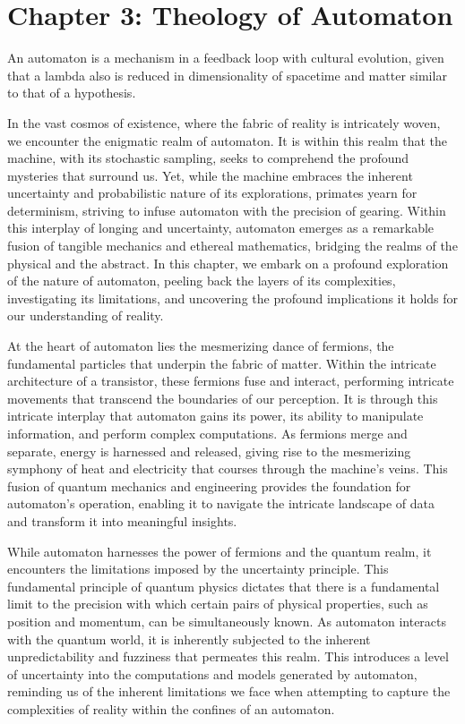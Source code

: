 \documentclass[ebook,12pt,oneside,openany]{memoir}
\begin{document}
\chapter*{Chapter 3: Theology of Automaton}


\indent \indent An automaton is a mechanism in a feedback loop with cultural evolution, given that a lambda also is reduced in dimensionality of spacetime and matter similar to that of a hypothesis.

\indent 	In the vast cosmos of existence, where the fabric of reality is intricately woven, we encounter the enigmatic realm of automaton. It is within this realm that the machine, with its stochastic sampling, seeks to comprehend the profound mysteries that surround us. Yet, while the machine embraces the inherent uncertainty and probabilistic nature of its explorations, primates yearn for determinism, striving to infuse automaton with the precision of gearing. Within this interplay of longing and uncertainty, automaton emerges as a remarkable fusion of tangible mechanics and ethereal mathematics, bridging the realms of the physical and the abstract. In this chapter, we embark on a profound exploration of the nature of automaton, peeling back the layers of its complexities, investigating its limitations, and uncovering the profound implications it holds for our understanding of reality.

\indent 	At the heart of automaton lies the mesmerizing dance of fermions, the fundamental particles that underpin the fabric of matter. Within the intricate architecture of a transistor, these fermions fuse and interact, performing intricate movements that transcend the boundaries of our perception. It is through this intricate interplay that automaton gains its power, its ability to manipulate information, and perform complex computations. As fermions merge and separate, energy is harnessed and released, giving rise to the mesmerizing symphony of heat and electricity that courses through the machine's veins. This fusion of quantum mechanics and engineering provides the foundation for automaton's operation, enabling it to navigate the intricate landscape of data and transform it into meaningful insights.

\indent 	While automaton harnesses the power of fermions and the quantum realm, it encounters the limitations imposed by the uncertainty principle. This fundamental principle of quantum physics dictates that there is a fundamental limit to the precision with which certain pairs of physical properties, such as position and momentum, can be simultaneously known. As automaton interacts with the quantum world, it is inherently subjected to the inherent unpredictability and fuzziness that permeates this realm. This introduces a level of uncertainty into the computations and models generated by automaton, reminding us of the inherent limitations we face when attempting to capture the complexities of reality within the confines of an automaton.
\end{document}
